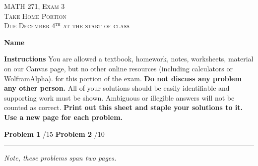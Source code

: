 \documentclass[12pt]{amsbook}
\begin{document}

\begin{center}
   \textsc{\large MATH 271, Exam 3}\\
   \textsc{Take Home Portion}\\
   \textsc{Due December 4$^\textrm{th}$ at the start of class}
\end{center}
\vspace{1cm}

\noindent\textbf{Name} \; \underline{\hspace{8cm}}

\vspace{1cm}

\noindent\textbf{Instructions} \; You are allowed a textbook, homework, notes, worksheets, material on our Canvas page, but no other online resources (including calculators or WolframAlpha). for this portion of the exam.  \textbf{Do not discuss any problem any other person.} All of your solutions should be easily identifiable and supporting work must be shown.  Ambiguous or illegible answers will not be counted as correct. \textbf{Print out this sheet and staple your solutions to it. Use a new page for each problem.}


\vspace{1cm}

\begin{center}\textbf{Problem 1} \; \underline{\hspace{1cm}}/15 \qquad \qquad \textbf{Problem 2} \; \underline{\hspace{1cm}}/10\end{center}

\vspace{1cm}

\hrule

\vspace*{1cm}
\noindent\emph{Note, these problems span two pages.}
\end{document}
